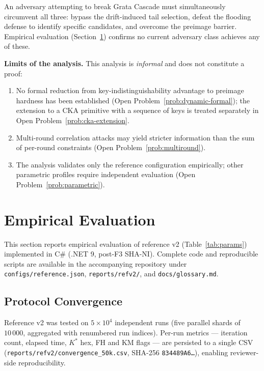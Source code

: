 \documentclass[11pt,a4paper]{article}
\begin{document}
An adversary attempting to break Grata Cascade must simultaneously circumvent all three: bypass the drift-induced tail selection, defeat the flooding defense to identify specific candidates, and overcome the preimage barrier. Empirical evaluation (Section~\ref{sec:empirical}) confirms no current adversary class achieves any of these.

\textbf{Limits of the analysis.} This analysis is \emph{informal} and does not constitute a proof:
\begin{enumerate}[leftmargin=*]
\item No formal reduction from key-indistinguishability advantage to preimage hardness has been established (Open Problem~\ref{prob:dynamic-formal}); the extension to a CKA primitive with a sequence of keys is treated separately in Open Problem~\ref{prob:cka-extension}.
\item Multi-round correlation attacks may yield stricter information than the sum of per-round constraints (Open Problem~\ref{prob:multiround}).
\item The analysis validates only the reference configuration empirically; other parametric profiles require independent evaluation (Open Problem~\ref{prob:parametric}).
\end{enumerate}

\section{Empirical Evaluation}\label{sec:empirical}

This section reports empirical evaluation of reference v2 (Table~\ref{tab:params}) implemented in C\# (.NET 9, post-F3 SHA-NI). Complete code and reproducible scripts are available in the accompanying repository under \texttt{configs/reference.json}, \texttt{reports/refv2/}, and \texttt{docs/glossary.md}.

\subsection{Protocol Convergence}\label{sec:empirical-convergence}

Reference v2 was tested on $5 \times 10^4$ independent runs (five parallel shards of $10\,000$, aggregated with renumbered run indices). Per-run metrics --- iteration count, elapsed time, $K^*$ hex, FH and KM flags --- are persisted to a single CSV (\texttt{reports/refv2/convergence\_50k.csv}, SHA-256 \texttt{834489A6\ldots}), enabling reviewer-side reproducibility.
\end{document}
